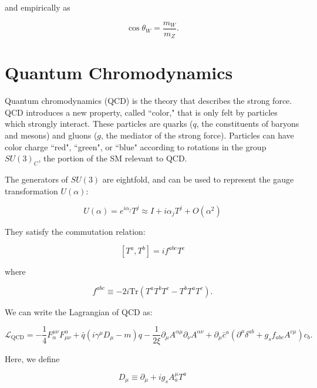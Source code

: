 and empirically as 

\begin{equation}
\cos \theta_{W} = \frac{m_{W}}{m_{Z}}.
\end{equation}

\section{Quantum Chromodynamics}

Quantum chromodynamics (QCD) is the theory that describes the strong force. QCD introduces a new property, called ``color," that is only felt by particles which strongly interact. These particles are quarks ($q$, the constituents of baryons and mesons) and gluons ($g$, the mediator of the strong force). Particles can have color charge ``red", ``green", or ``blue" according to rotations in the group $SU(3)_{C}$, the portion of the SM relevant to QCD.

The generators of $SU(3)$ are eightfold, and can be used to represent the gauge transformation $U(\alpha)$:

\begin{equation}
U(\alpha) = e^{i\alpha_{j}}T^{j} \approx I + i\alpha_{j}T^{j} + O(\alpha^{2})
\end{equation}

They satisfy the commutation relation:

\begin{equation}
\left[T^{a}, T^{b}\right] = if^{abc}T^{c}
\end{equation}

where 

\begin{equation}
f^{abc} \equiv -2i\text{Tr}\left(T^{a}T^{b}T^{c} - T^{b}T^{a}T^{c}\right).
\end{equation}

We can write the Lagrangian of QCD as:

\begin{equation}
\mathcal{L}_{\text{QCD}} = -\frac{1}{4}F^{\mu\nu}_{\alpha}F^{\alpha}_{\mu\nu} + \bar{q}\left(i\gamma^{\mu}D_{\mu} - m\right)q - \frac{1}{2\xi}\partial_{\mu}A^{\alpha\mu}\partial_{\nu}A^{\alpha\nu} + \partial_{\mu}\bar{c}^{a}\left(\partial^{\mu}\delta^{ab} + g_{s}f_{abc}A^{c\mu}\right)c_{b}.
\end{equation}

Here, we define

\begin{equation}
D_{\mu} \equiv \partial_{\mu} + ig_{s}A^{\mu}_{a}T^{a}
\end{equation}


